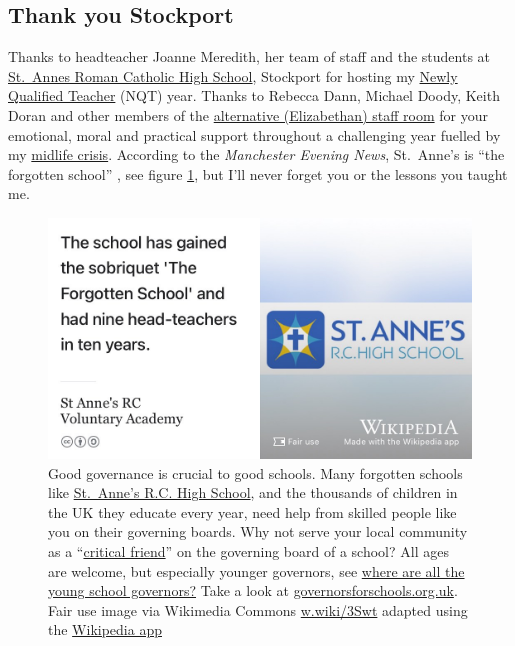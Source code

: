 \documentclass[
]{book}
\begin{document}
\hypertarget{stockport}{%
\subsection{Thank you Stockport}\label{stockport}}

Thanks to headteacher Joanne Meredith, her team of staff and the students at \href{https://en.wikipedia.org/wiki/St_Anne\%27s_RC_Voluntary_Academy}{St.~Annes Roman Catholic High School}, Stockport for hosting my \href{https://en.wikipedia.org/wiki/Newly_qualified_teacher}{Newly Qualified Teacher} (NQT) year. Thanks to Rebecca Dann, Michael Doody, Keith Doran and other members of the \href{https://www.elizabethanstockport.co.uk/}{alternative (Elizabethan) staff room} for your emotional, moral and practical support throughout a challenging year fuelled by my \href{https://en.wikipedia.org/wiki/Midlife_crisis}{midlife crisis}. According to the \emph{Manchester Evening News}, St.~Anne's is ``the forgotten school'' \citep{stannes1, stannes2}, see figure \ref{fig:st-annes-fig}, but I'll never forget you or the lessons you taught me.

\begin{figure}

{\centering \includegraphics[width=1\linewidth]{images/st-annes-rc-high-school} 

}

\caption{Good governance is crucial to good schools. Many forgotten schools like \href{https://en.wikipedia.org/wiki/St_Anne\%27s_RC_Voluntary_Academy}{St.~Anne's R.C. High School}, and the thousands of children in the UK they educate every year, need help from skilled people like you on their governing boards. Why not serve your local community as a ``\href{https://en.wikipedia.org/wiki/Critical_friend}{critical friend}'' on the governing board of a school? All ages are welcome, but especially younger governors, see \href{https://www.theguardian.com/teacher-network/2015/mar/11/young-people-school-governors}{where are all the young school governors?} \citep{youngovernors} Take a look at \href{https://governorsforschools.org.uk/}{governorsforschools.org.uk}. Fair use image via Wikimedia Commons \href{https://w.wiki/3Swt}{w.wiki/3Swt} adapted using the \href{https://apps.apple.com/us/app/wikipedia/id324715238}{Wikipedia app}}\label{fig:st-annes-fig}
\end{figure}
\end{document}
